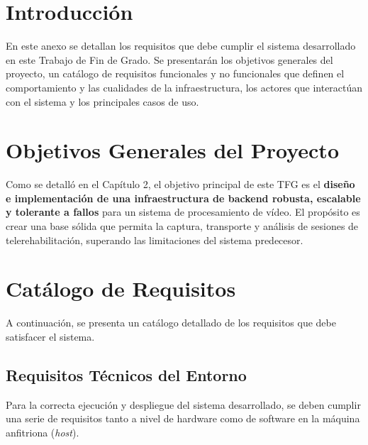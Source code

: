 \label{apendice:requisitos}

\section{Introducción}
En este anexo se detallan los requisitos que debe cumplir el sistema desarrollado en este Trabajo de Fin de Grado. Se presentarán los objetivos generales del proyecto, un catálogo de requisitos funcionales y no funcionales que definen el comportamiento y las cualidades de la infraestructura, los actores que interactúan con el sistema y los principales casos de uso.

\section{Objetivos Generales del Proyecto}
Como se detalló en el Capítulo 2, el objetivo principal de este TFG es el \textbf{diseño e implementación de una infraestructura de backend robusta, escalable y tolerante a fallos} para un sistema de procesamiento de vídeo. El propósito es crear una base sólida que permita la captura, transporte y análisis de sesiones de telerehabilitación, superando las limitaciones del sistema predecesor.

\section{Catálogo de Requisitos}
A continuación, se presenta un catálogo detallado de los requisitos que debe satisfacer el sistema.

\subsection{Requisitos Técnicos del Entorno}
Para la correcta ejecución y despliegue del sistema desarrollado, se deben cumplir una serie de requisitos tanto a nivel de hardware como de software en la máquina anfitriona (\textit{host}).

